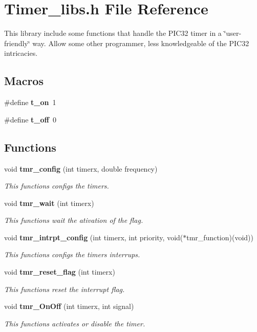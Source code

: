 \section{Timer\+\_\+libs.\+h File Reference}
\label{_timer__libs_8h}


This library include some functions that handle the P\+I\+C32 timer in a \char`\"{}user-\/friendly\char`\"{} way. Allow some other programmer, less knowledgeable of the P\+I\+C32 intricacies.  


\subsection*{Macros}
\begin{DoxyCompactItemize}
\item 
\#define \textbf{ t\+\_\+on}~1
\item 
\#define \textbf{ t\+\_\+off}~0
\end{DoxyCompactItemize}
\subsection*{Functions}
\begin{DoxyCompactItemize}
\item 
void \textbf{ tmr\+\_\+config} (int timerx, double frequency)
\begin{DoxyCompactList}\small\item\em This functions configs the timer\textquotesingle{}s. \end{DoxyCompactList}\item 
void \textbf{ tmr\+\_\+wait} (int timerx)
\begin{DoxyCompactList}\small\item\em This functions wait the ativation of the flag. \end{DoxyCompactList}\item 
void \textbf{ tmr\+\_\+intrpt\+\_\+config} (int timerx, int priority, void($\ast$tmr\+\_\+function)(void))
\begin{DoxyCompactList}\small\item\em This functions configs the timer\textquotesingle{}s interrups. \end{DoxyCompactList}\item 
void \textbf{ tmr\+\_\+reset\+\_\+flag} (int timerx)
\begin{DoxyCompactList}\small\item\em This functions reset the interrupt flag. \end{DoxyCompactList}\item 
void \textbf{ tmr\+\_\+\+On\+Off} (int timerx, int signal)
\begin{DoxyCompactList}\small\item\em This functions activates or disable the timer. \end{DoxyCompactList}\end{DoxyCompactItemize}


